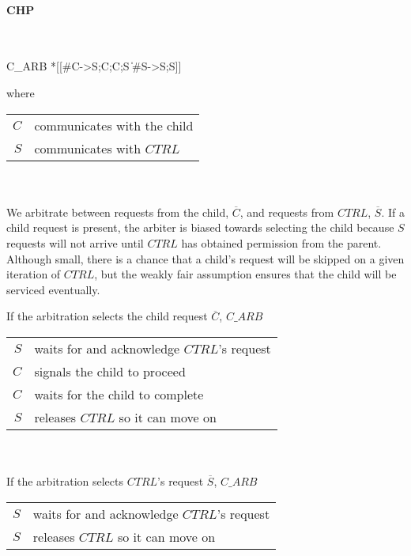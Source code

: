 \documentclass[aer.tex]{subfiles}
\begin{document}
\paragraph{CHP}\mbox{}\\

\begin{csp}
C_ARB\equiv
  *[[#C->S;C;C;S
    \|#S->S;S]]
\end{csp}

\noindent where 

\begin{tabular}[]{rl}
  $C$ & communicates with the child \\ 
  $S$ & communicates with $CTRL$ \\
\end{tabular} \\ \\

We arbitrate between requests from the child, $\overline{C}$, and 
requests from $CTRL$, $\overline{S}$. If a child request is present, the arbiter is biased towards selecting the child because $S$ requests will not arrive until $CTRL$ has obtained permission from the parent. Although small, there is a chance that a child's request will be skipped on a given iteration of $CTRL$, but the weakly fair assumption ensures that the child will be serviced eventually.

\noindent If the arbitration selects the child request $\overline{C}$, $C\!\_ARB$

\begin{tabular}[]{rl}
  $S$ & waits for and acknowledge $CTRL$'s request \\
  $C$ & signals the child to proceed \\
  $C$ & waits for the child to complete \\
  $S$ & releases $CTRL$ so it can move on \\
\end{tabular} \\ \\

\noindent If the arbitration selects $CTRL$'s request $\overline{S}$, $C\!\_ARB$

\begin{tabular}[]{rl}
  $S$ & waits for and acknowledge $CTRL$'s request \\
  $S$ & releases $CTRL$ so it can move on \\
\end{tabular} \\ \\
\end{document}
